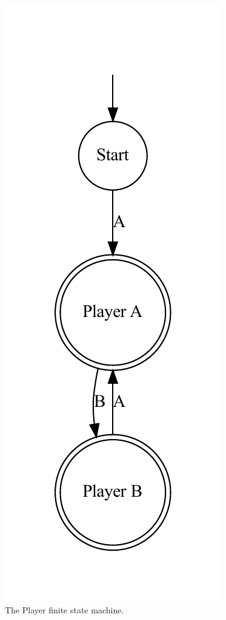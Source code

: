 \documentclass[sigplan,anonymous,review]{acmart}
\begin{document}
\begin{figure}
    \centering
    \includegraphics[width=0.7\linewidth]{figures/nimexample/playerFSM.pdf}
    \caption{The Player finite state machine.}
    \label{fig:nimPlayerFSM}
\end{figure}
\end{document}
